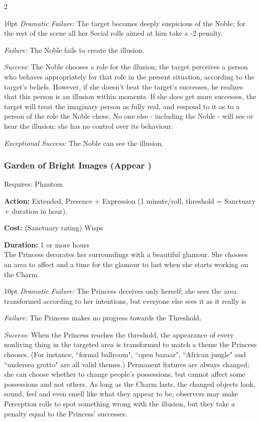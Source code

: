 \begin{multicols}{2}
\begin{myindentpar}{10pt}    \emph{Dramatic Failure:} The target becomes deeply suspicious of the Noble; for the rest of the scene all her Social rolls aimed at him take a -2 penalty.

    \emph{Failure:}  The Noble fails to create the illusion.

    \emph{Success:} The Noble chooses a role for the illusion; the target perceives a person who behaves appropriately for that role in the present situation, according to the target’s beliefs. However, if she doesn’t beat the target’s successes, he realizes that this person is an illusion within moments. If she does get more successes, the target will treat the imaginary person as fully real, and respond to it as to a person of the role the Noble chose. No one else - including the Noble - will see or hear the illusion; she has no control over its behaviour.

    \emph{Exceptional Success:} The Noble can see the illusion. 	\end{myindentpar}

\subsubsection*{Garden of Bright Images (Appear \textbullet\textbullet\textbullet\textbullet)}
\noindent Requires: Phantom

\noindent \textbf{Action:} Extended, Presence + Expression (1 minute/roll, threshold = Sanctuary + duration in hour). 

\noindent \textbf{Cost:} (Sanctuary rating) Wisps

\noindent \textbf{Duration:} 1 or more hours \\

\noindent The Princess decorates her surroundings with a beautiful glamour. She chooses an area to affect and a time for the glamour to last when she starts working on the Charm.

\begin{myindentpar}{10pt}    \emph{Dramatic Failure:} The Princess deceives only herself; she sees the area transformed according to her intentions, but everyone else sees it as it really is

\emph{Failure:} The Princess makes no progress towards the Threshold.

\emph{Success:} When the Princess reaches the threshold, the appearance of every nonliving thing in the targeted area is transformed to match a theme the Princess chooses. (For instance, \textquotedblleft formal ballroom", \textquotedblleft open bazaar", \textquotedblleft African jungle" and \textquotedblleft undersea grotto" are all valid themes.) Permanent fixtures are always changed; she can choose whether to change people’s possessions, but cannot affect some possessions and not others. As long as the Charm lasts, the changed objects look, sound, feel and even smell like what they appear to be; observers may make Perception rolls to spot something wrong with the illusion, but they take a penalty equal to the Princess’ successes.


\end{myindentpar}
\end{multicols}
